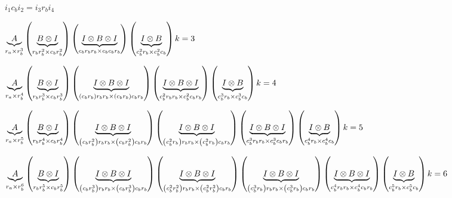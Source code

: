 \documentclass[12pt]{article}
\begin{document}
\begin{landscape}%

$i_{1}c_{b}i_{2}=i_{3}r_{b}i_{4}$

$\underset{r_{a}\times r_{b}^{3}}{\underbrace{A}}\left( \underset{%
r_{b}r_{b}^{2}\times c_{b}r_{b}^{2}}{\underbrace{B\otimes I}}\right) \left( 
\underset{c_{b}r_{b}r_{b}\times c_{b}c_{b}r_{b}}{\underbrace{I\otimes
B\otimes I}}\right) \left( \underset{c_{b}^{2}r_{b}\times c_{b}^{2}c_{b}}{%
\underbrace{I\otimes B}}\right) k=3$

$\underset{r_{a}\times r_{b}^{4}}{\underbrace{A}}\left( \underset{%
r_{b}r_{b}^{3}\times c_{b}r_{b}^{3}}{\underbrace{B\otimes I}}\right) \left( 
\underset{\left( c_{b}r_{b}\right) r_{b}r_{b}\times \left( c_{b}r_{b}\right)
c_{b}r_{b}}{\underbrace{I\otimes B\otimes I}}\right) \left( \underset{%
c_{b}^{2}r_{b}r_{b}\times c_{b}^{2}c_{b}r_{b}}{\underbrace{I\otimes B\otimes
I}}\right) \left( \underset{c_{b}^{3}r_{b}\times c_{b}^{3}c_{b}}{\underbrace{%
I\otimes B}}\right) k=4$

$\underset{r_{a}\times r_{b}^{5}}{\underbrace{A}}\left( \underset{%
r_{b}r_{b}^{4}\times c_{b}r_{b}^{4}}{\underbrace{B\otimes I}}\right) \left( 
\underset{\left( c_{b}r_{b}^{2}\right) r_{b}r_{b}\times \left(
c_{b}r_{b}^{2}\right) c_{b}r_{b}}{\underbrace{I\otimes B\otimes I}}\right)
\left( \underset{\left( c_{b}^{2}r_{b}\right) r_{b}r_{b}\times \left(
c_{b}^{2}r_{b}\right) c_{b}r_{b}}{\underbrace{I\otimes B\otimes I}}\right)
\left( \underset{c_{b}^{3}r_{b}r_{b}\times c_{b}^{3}c_{b}r_{b}}{\underbrace{%
I\otimes B\otimes I}}\right) \left( \underset{c_{b}^{4}r_{b}\times
c_{b}^{4}c_{b}}{\underbrace{I\otimes B}}\right) k=5$

$\underset{r_{a}\times r_{b}^{6}}{\underbrace{A}}\left( \underset{%
r_{b}r_{b}^{5}\times c_{b}r_{b}^{5}}{\underbrace{B\otimes I}}\right) \left( 
\underset{\left( c_{b}r_{b}^{3}\right) r_{b}r_{b}\times \left(
c_{b}r_{b}^{3}\right) c_{b}r_{b}}{\underbrace{I\otimes B\otimes I}}\right)
\left( \underset{\left( c_{b}^{2}r_{b}^{2}\right) r_{b}r_{b}\times \left(
c_{b}^{2}r_{b}^{2}\right) c_{b}r_{b}}{\underbrace{I\otimes B\otimes I}}%
\right) \left( \underset{\left( c_{b}^{3}r_{b}\right) r_{b}r_{b}\times
\left( c_{b}^{3}r_{b}\right) c_{b}r_{b}}{\underbrace{I\otimes B\otimes I}}%
\right) \left( \underset{c_{b}^{4}r_{b}r_{b}\times c_{b}^{4}c_{b}r_{b}}{%
\underbrace{I\otimes B\otimes I}}\right) \left( \underset{%
c_{b}^{5}r_{b}\times c_{b}^{5}c_{b}}{\underbrace{I\otimes B}}\right) k=6$


\end{landscape}
\end{document}

